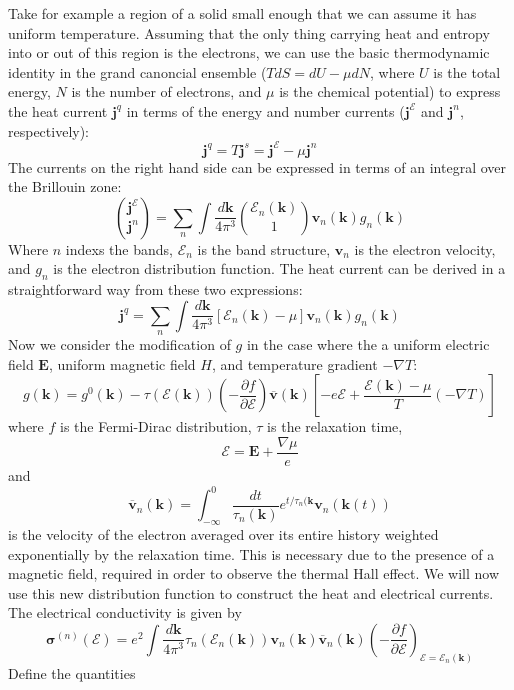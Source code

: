 \documentclass{thesis-umich}
\begin{document}
Take for example a region of a solid small enough that we can assume it has
uniform temperature. Assuming that the only thing carrying heat and entropy into
or out of this region is the electrons, we can use the basic thermodynamic
identity in the grand canoncial ensemble ($T dS = dU - \mu dN$, where $U$ is the
total energy, $N$ is the number of electrons, and $\mu$ is the chemical
potential) to express the heat current $\mathbf{j}^q$ in terms of the energy and
number currents ($\mathbf{j}^\mathcal{E}$ and $\mathbf{j}^n$, respectively):
\[ \mathbf{j}^q = T \mathbf{j}^s = \mathbf{j}^\mathcal{E} - \mu \mathbf{j}^n\]
The currents on the right hand side can be expressed in terms of an integral
over the Brillouin zone:
\[ \binom{\mathbf{j}^\mathcal{E}}{\mathbf{j}^n} = \sum_n \int
	\frac{d\mathbf{k}}{4\pi^3}\binom{\mathcal{E}_n(\mathbf{k})}{1}
	\mathbf{v}_n(\mathbf{k})g_n(\mathbf{k}) \]
Where $n$ indexs the bands, $\mathcal{E}_n$ is the band structure,
$\mathbf{v}_n$ is the electron velocity, and $g_n$ is the electron distribution
function. The heat current can be derived in a straightforward way from these
two expressions:
\[ \mathbf{j}^q = \sum_n \int
	\frac{d\mathbf{k}}{4\pi^3}[\mathcal{E}_n(\mathbf{k})-\mu]
	\mathbf{v}_n(\mathbf{k})g_n(\mathbf{k}) \]
Now we consider the modification of $g$ in the case where the a uniform electric
field $\mathbf{E}$, uniform magnetic field $H$, and temperature gradient $-\nabla
T$:
\[ g(\mathbf{k}) = g^0(\mathbf{k}) -
	\tau(\mathcal{E}(\mathbf{k}))\left(-\frac{\partial f}{\partial
		\mathcal{E}}\right)\overline{\mathbf{v}}(\mathbf{k})\left[-e\mathbf{\mathcal{E}}
		+ \frac{\mathcal{E}(\mathbf{k}) - \mu}{T}(-\nabla T)\right] \]
where $f$ is the Fermi-Dirac distribution, $\tau$ is the relaxation time,
\[\mathbf{\mathcal{E}} = \mathbf{E} + \frac{\nabla\mu}{e}\]
and 
\[\overline{\mathbf{v}}_n(\mathbf{k}) = \int_{-\infty}^0
\frac{dt}{\tau_n(\mathbf{k})}e^{t/\tau_n(\mathbf{k}}\mathbf{v}_n(\mathbf{k}(t))\]
is the velocity of the electron averaged over its entire history weighted
exponentially by the relaxation time. This is necessary due to the presence of a
magnetic field, required in order to observe the thermal Hall effect. We will
now use this new distribution function to construct the heat and electrical
currents. The electrical conductivity is given by
\[ \mathbf{\sigma}^{(n)}(\mathcal{E}) = e^2 \int \frac{d\mathbf{k}}{4\pi^3}
\tau_n(\mathcal{E}_n(\mathbf{k}))
\mathbf{v}_n(\mathbf{k})\overline{\mathbf{v}}_n(\mathbf{k})\left(-\frac{\partial
f}{\partial \mathcal{E}}\right)_{\mathcal{E}=\mathcal{E}_n(\mathbf{k})}\]
Define the quantities
\end{document}
